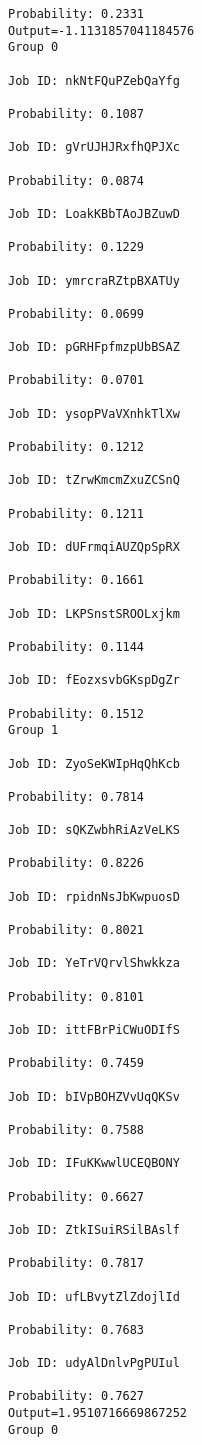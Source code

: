 \documentclass[11pt]{article}
\begin{document}
\begin{Verbatim}[commandchars=\\\{\}]
Probability: 0.2331
Output=-1.1131857041184576
Group 0

Job ID: nkNtFQuPZebQaYfg

Probability: 0.1087

Job ID: gVrUJHJRxfhQPJXc

Probability: 0.0874

Job ID: LoakKBbTAoJBZuwD

Probability: 0.1229

Job ID: ymrcraRZtpBXATUy

Probability: 0.0699

Job ID: pGRHFpfmzpUbBSAZ

Probability: 0.0701

Job ID: ysopPVaVXnhkTlXw

Probability: 0.1212

Job ID: tZrwKmcmZxuZCSnQ

Probability: 0.1211

Job ID: dUFrmqiAUZQpSpRX

Probability: 0.1661

Job ID: LKPSnstSROOLxjkm

Probability: 0.1144

Job ID: fEozxsvbGKspDgZr

Probability: 0.1512
Group 1

Job ID: ZyoSeKWIpHqQhKcb

Probability: 0.7814

Job ID: sQKZwbhRiAzVeLKS

Probability: 0.8226

Job ID: rpidnNsJbKwpuosD

Probability: 0.8021

Job ID: YeTrVQrvlShwkkza

Probability: 0.8101

Job ID: ittFBrPiCWuODIfS

Probability: 0.7459

Job ID: bIVpBOHZVvUqQKSv

Probability: 0.7588

Job ID: IFuKKwwlUCEQBONY

Probability: 0.6627

Job ID: ZtkISuiRSilBAslf

Probability: 0.7817

Job ID: ufLBvytZlZdojlId

Probability: 0.7683

Job ID: udyAlDnlvPgPUIul

Probability: 0.7627
Output=1.9510716669867252
Group 0


\end{Verbatim}
\end{document}
